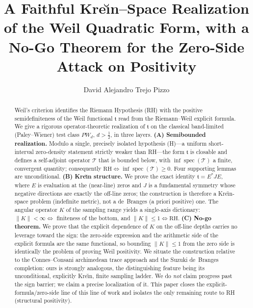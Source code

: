 \documentclass[11pt]{amsart}
\title[A Kre\u{\i}n--Space Weil Realization]{A Faithful Kre\u{\i}n--Space Realization of the Weil Quadratic Form, with a No-Go Theorem for the Zero-Side Attack on Positivity}
\author{David Alejandro Trejo Pizzo}
\theoremstyle{definition}
\theoremstyle{remark}
\newcommand{\spec}{\operatorname{spec}}
\newcommand{\half}{\tfrac12}
\newcommand{\PW}{\mathit{PW}_d}
\newcommand{\tform}{\mathfrak t}
\newcommand{\Top}{\mathcal T}
\newcommand{\Kop}{K}
\newcommand{\Norm}[1]{\lVert #1 \rVert}
\begin{document}
\begin{abstract}
Weil's criterion identifies the Riemann Hypothesis (RH) with the positive
semidefiniteness of the Weil functional $\tform$ read from the Riemann--Weil explicit
formula. We give a rigorous operator-theoretic realization of $\tform$ on the
classical band-limited (Paley--Wiener) test class $\PW$, $d>\half$, in three layers.
\textbf{(A) Semibounded realization.} Modulo a single, precisely isolated hypothesis
\textnormal{(H)}---a uniform short-interval zero-density statement strictly weaker than
RH---the form $\tform$ is closable and defines a self-adjoint operator $\Top$ that is
bounded below, with $\inf\spec(\Top)$ a finite, convergent quantity; consequently
$\mathrm{RH}\iff \inf\spec(\Top)\ge0$. Four supporting lemmas are unconditional.
\textbf{(B) Kre\u{\i}n structure.} We prove the exact identity $\tform=E^{*}JE$, where
$E$ is evaluation at the (near-line) zeros and $J$ is a fundamental symmetry whose
negative directions are exactly the off-line zeros; the construction is therefore a
Kre\u{\i}n-space problem (indefinite metric), not a de~Branges (a priori positive)
one. The angular operator $\Kop$ of the sampling range yields a single-axis dictionary:
$\Norm{\Kop}<\infty\iff$ finiteness of the bottom, and $\Norm{\Kop}\le1\iff\mathrm{RH}$.
\textbf{(C) No-go theorem.} We prove that the explicit dependence of $\Kop$ on the
off-line depths carries no leverage toward the sign: the zero-side expression and the
arithmetic side of the explicit formula are the same functional, so bounding
$\Norm{\Kop}\le1$ from the zero side is identically the problem of proving Weil
positivity. We situate the construction relative to the Connes--Consani archimedean
trace approach and the Suzuki de~Branges completion: ours is strongly analogous,
the distinguishing feature being its unconditional, explicitly Kre\u{\i}n, finite
sampling ladder. We do \emph{not} claim progress past the sign barrier; we claim a
precise localization of it. This paper closes the explicit-formula/zero-side line of
this line of work and isolates the only remaining route to RH (structural positivity).
\end{abstract}

\maketitle



\tableofcontents
\newpage

\end{document}
